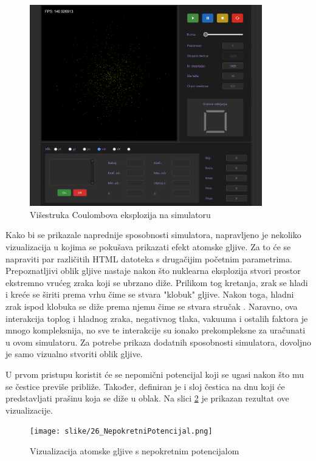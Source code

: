 \documentclass{foi}
\begin{document}
\begin{figure}[H]
    \centering
    \includegraphics[width=0.9\textwidth]{slike/25_VCESimulator.png}
    \captionsetup{justification=centering}
    \caption{Višestruka Coulombova eksplozija na simulatoru}
\label{fig:VCESimulator}
\end{figure}

Kako bi se prikazale naprednije sposobnosti simulatora, napravljeno je nekoliko vizualizacija u kojima se pokušava prikazati efekt atomske gljive. Za to će se napraviti par različitih HTML datoteka s drugačijim početnim parametrima. Prepoznatljivi oblik gljive nastaje nakon što nuklearna eksplozija stvori prostor ekstremno vrućeg zraka koji se ubrzano diže. Prilikom tog kretanja, zrak se hladi i kreće se širiti prema vrhu čime se stvara "klobuk" gljive. Nakon toga, hladni zrak ispod klobuka se diže prema njemu čime se stvara stručak \parencite{MushroomCloudBezDat}. Naravno, ova interakcija toplog i hladnog zraka, negativnog tlaka, vakuuma i ostalih faktora je mnogo kompleksnija, no sve te interakcije su ionako prekompleksne za uračunati u ovom simulatoru. Za potrebe prikaza dodatnih sposobnosti simulatora, dovoljno je samo vizualno stvoriti oblik gljive.

U prvom pristupu koristit će se nepomični potencijal koji se ugasi nakon što mu se čestice previše približe. Također, definiran je i sloj čestica na dnu koji će predstavljati prašinu koja se diže u oblak. Na slici \ref{fig:NepokretniPotencijal} je prikazan rezultat ove vizualizacije.

\begin{figure}[H]
    \centering
    \texttt{[image: slike/26\_NepokretniPotencijal.png]}
    \captionsetup{justification=centering}
    \caption{Vizualizacija atomske gljive s nepokretnim potencijalom}
\label{fig:NepokretniPotencijal}
\end{figure}
\end{document}
